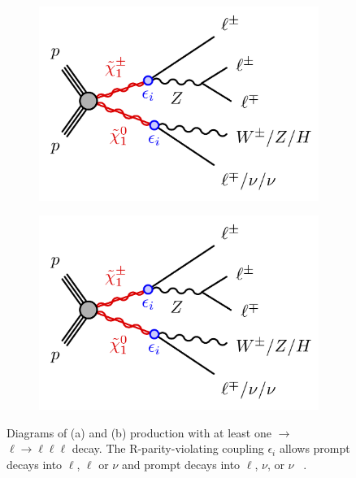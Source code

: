 \begin{figure}[h]
  \centering
  \begin{subfigure}[b]{0.49\textwidth}
    \centering
    \includegraphics[width=1.0\textwidth]{figs/rpvthreel/fig_01b.png}
    \caption{}
    \label{fig:feyna}
  \end{subfigure}
  \hfill
  \begin{subfigure}[b]{0.49\textwidth}
    \centering
    \includegraphics[width=1.00\textwidth]{figs/rpvthreel/fig_01b.png}
    \caption{}
    \label{fig:feynb}
  \end{subfigure}
  \caption[Diagrams of (a) \CCsignal and \CNsignal (b) production with at least one \chonepm$\rightarrow$\Zboson $\ell \rightarrow \ell\ell\ell$ decay.]{Diagrams of (a) \CCsignal and \CCsignal (b) production with at least one \chonepm$\rightarrow$\Zboson$\ell\rightarrow\ell\ell\ell$ decay.
  The R-parity-violating coupling $\epsilon_{i}$ allows prompt \chonepm decays into \Zboson$\ell$, \Hboson$\ell$ or \Wboson$\nu$ and prompt \none decays into \Wboson$\ell$, \Zboson$\nu$, or \Hboson$\nu$ ~\cite{ATLAS:2020uer}.}
  \label{fig:feyn}
\end{figure}


